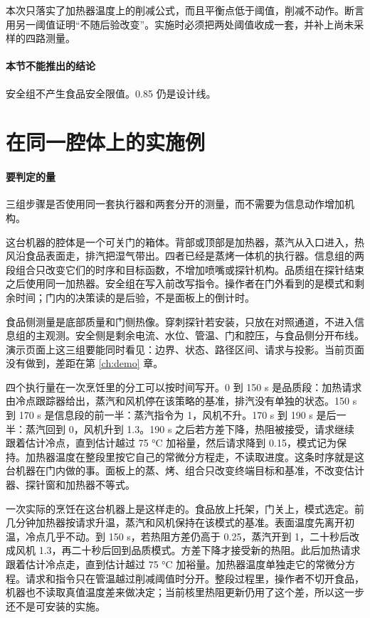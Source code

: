 本次只落实了加热器温度上的削减公式，而且平衡点低于阈值，削减不动作。断言用另一阈值证明“不随后验改变”。实施时必须把两处阈值收成一套，并补上尚未采样的四路测量。

\paragraph{本节不能推出的结论}
安全组不产生食品安全限值。0.85 仍是设计线。

\section{在同一腔体上的实施例}

\paragraph{要判定的量}
三组步骤是否使用同一套执行器和两套分开的测量，而不需要为信息动作增加机构。

这台机器的腔体是一个可关门的箱体。背部或顶部是加热器，蒸汽从入口进入，热风沿食品表面走，排汽把湿气带出。四者已经是蒸烤一体机的执行器。信息组的两段组合只改变它们的时序和目标函数，不增加喷嘴或探针机构。品质组在探针结束之后使用同一加热器。安全组在写入前改写指令。操作者在门外看到的是模式和剩余时间；门内的决策读的是后验，不是面板上的倒计时。

食品侧测量是底部质量和门侧热像。穿刺探针若安装，只放在对照通道，不进入信息组的主观测。安全侧是剩余电流、水位、管温、门和腔压，与食品侧分开布线。演示页面上这三组要能同时看见：边界、状态、路径区间、请求与投影。当前页面没有做到，差距在第 \ref{ch:demo} 章。

四个执行量在一次烹饪里的分工可以按时间写开。0 到 150 s 是品质段：加热请求由冷点跟踪器给出，蒸汽和风机停在该策略的基准，排汽没有单独的状态。150 s 到 170 s 是信息段的前一半：蒸汽指令为 1，风机不升。170 s 到 190 s 是后一半：蒸汽回到 0，风机升到 1.3。190 s 之后若方差下降，热阻被接受，请求继续跟着估计冷点，直到估计越过 75 °C 加裕量，然后请求降到 0.15，模式记为保持。加热器温度在整段里按它自己的常微分方程走，不读取进度。这条时序就是这台机器在门内做的事。面板上的蒸、烤、组合只改变终端目标和基准，不改变估计器、探针窗和加热器不等式。

一次实际的烹饪在这台机器上是这样走的。食品放上托架，门关上，模式选定。前几分钟加热器按请求升温，蒸汽和风机保持在该模式的基准。表面温度先离开初温，冷点几乎不动。到 150 s，若热阻方差仍高于 0.25，蒸汽开到 1，二十秒后改成风机 1.3，再二十秒后回到品质模式。方差下降才接受新的热阻。此后加热请求跟着估计冷点走，直到估计越过 75 °C 加裕量。加热器温度单独走它的常微分方程。请求和指令只在管温越过削减阈值时分开。整段过程里，操作者不切开食品，机器也不读取真值温度差来做决定；当前核里热阻更新仍用了这个差，所以这一步还不是可安装的实施。


